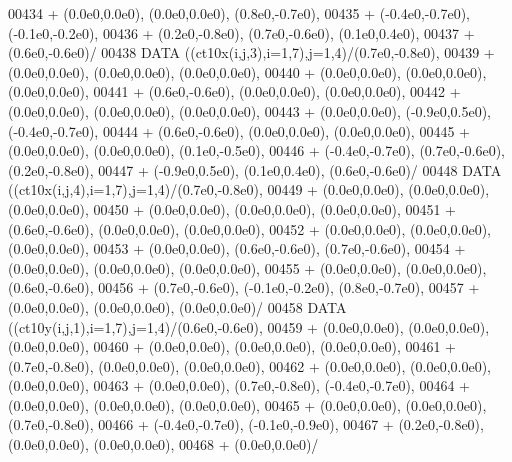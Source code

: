 \begin{DoxyCode}
00434      +                  (0.0e0,0.0e0), (0.0e0,0.0e0), (0.8e0,-0.7e0),
00435      +                  (-0.4e0,-0.7e0), (-0.1e0,-0.2e0),
00436      +                  (0.2e0,-0.8e0), (0.7e0,-0.6e0), (0.1e0,0.4e0),
00437      +                  (0.6e0,-0.6e0)/
00438       \textcolor{keyword}{DATA}              ((ct10x(i,j,3),i=1,7),j=1,4)/(0.7e0,-0.8e0),
00439      +                  (0.0e0,0.0e0), (0.0e0,0.0e0), (0.0e0,0.0e0),
00440      +                  (0.0e0,0.0e0), (0.0e0,0.0e0), (0.0e0,0.0e0),
00441      +                  (0.6e0,-0.6e0), (0.0e0,0.0e0), (0.0e0,0.0e0),
00442      +                  (0.0e0,0.0e0), (0.0e0,0.0e0), (0.0e0,0.0e0),
00443      +                  (0.0e0,0.0e0), (-0.9e0,0.5e0), (-0.4e0,-0.7e0),
00444      +                  (0.6e0,-0.6e0), (0.0e0,0.0e0), (0.0e0,0.0e0),
00445      +                  (0.0e0,0.0e0), (0.0e0,0.0e0), (0.1e0,-0.5e0),
00446      +                  (-0.4e0,-0.7e0), (0.7e0,-0.6e0), (0.2e0,-0.8e0),
00447      +                  (-0.9e0,0.5e0), (0.1e0,0.4e0), (0.6e0,-0.6e0)/
00448       \textcolor{keyword}{DATA}              ((ct10x(i,j,4),i=1,7),j=1,4)/(0.7e0,-0.8e0),
00449      +                  (0.0e0,0.0e0), (0.0e0,0.0e0), (0.0e0,0.0e0),
00450      +                  (0.0e0,0.0e0), (0.0e0,0.0e0), (0.0e0,0.0e0),
00451      +                  (0.6e0,-0.6e0), (0.0e0,0.0e0), (0.0e0,0.0e0),
00452      +                  (0.0e0,0.0e0), (0.0e0,0.0e0), (0.0e0,0.0e0),
00453      +                  (0.0e0,0.0e0), (0.6e0,-0.6e0), (0.7e0,-0.6e0),
00454      +                  (0.0e0,0.0e0), (0.0e0,0.0e0), (0.0e0,0.0e0),
00455      +                  (0.0e0,0.0e0), (0.0e0,0.0e0), (0.6e0,-0.6e0),
00456      +                  (0.7e0,-0.6e0), (-0.1e0,-0.2e0), (0.8e0,-0.7e0),
00457      +                  (0.0e0,0.0e0), (0.0e0,0.0e0), (0.0e0,0.0e0)/
00458       \textcolor{keyword}{DATA}              ((ct10y(i,j,1),i=1,7),j=1,4)/(0.6e0,-0.6e0),
00459      +                  (0.0e0,0.0e0), (0.0e0,0.0e0), (0.0e0,0.0e0),
00460      +                  (0.0e0,0.0e0), (0.0e0,0.0e0), (0.0e0,0.0e0),
00461      +                  (0.7e0,-0.8e0), (0.0e0,0.0e0), (0.0e0,0.0e0),
00462      +                  (0.0e0,0.0e0), (0.0e0,0.0e0), (0.0e0,0.0e0),
00463      +                  (0.0e0,0.0e0), (0.7e0,-0.8e0), (-0.4e0,-0.7e0),
00464      +                  (0.0e0,0.0e0), (0.0e0,0.0e0), (0.0e0,0.0e0),
00465      +                  (0.0e0,0.0e0), (0.0e0,0.0e0), (0.7e0,-0.8e0),
00466      +                  (-0.4e0,-0.7e0), (-0.1e0,-0.9e0),
00467      +                  (0.2e0,-0.8e0), (0.0e0,0.0e0), (0.0e0,0.0e0),
00468      +                  (0.0e0,0.0e0)/

\end{DoxyCode}
